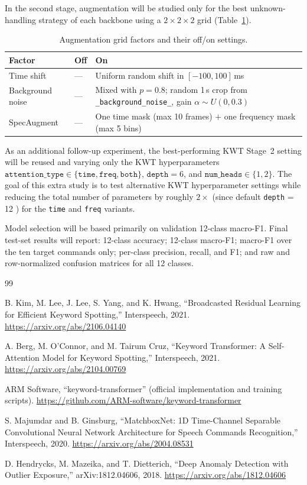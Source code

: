 \documentclass[11pt]{article}
\begin{document}
In the second stage, augmentation will be studied only for the best unknown-handling strategy of each backbone using a \(2\times2\times2\) grid (Table~\ref{tab:aug_grid}).

\begin{table}[h]
\centering
\caption{Augmentation grid factors and their off/on settings.}
\label{tab:aug_grid}
\begin{tabular}{llp{6.5cm}}
\toprule
\textbf{Factor} & \textbf{Off} & \textbf{On} \\
\midrule
Time shift & --- & Uniform random shift in $[-100, 100]$\,ms \\
Background noise & --- & Mixed with $p{=}0.8$; random 1\,s crop from \texttt{\_background\_noise\_}, gain $\alpha \sim U(0, 0.3)$ \\
SpecAugment & --- & One time mask (max 10 frames) $+$ one frequency mask (max 5 bins) \\
\bottomrule
\end{tabular}
\end{table}

As an additional follow-up experiment, the best-performing KWT Stage~2 setting will be reused and varying only the KWT hyperparameters \(\texttt{attention\_type} \in \{\texttt{time}, \texttt{freq}, \texttt{both}\}\), \(\texttt{depth} = 6\), and \(\texttt{num\_heads} \in \{1, 2\}\). The goal of this extra study is to test alternative KWT hyperparameter settings while reducing the total number of parameters by roughly \(2\times\) (since default \texttt{depth} = 12 \cite{kwt}) for the \texttt{time} and \texttt{freq} variants.

Model selection will be based primarily on validation 12-class macro-F1. Final test-set results will report: 12-class accuracy; 12-class macro-F1; macro-F1 over the ten target commands only; per-class precision, recall, and F1; and raw and row-normalized confusion matrices for all 12 classes.



\begin{thebibliography}{99}

B. Kim, M. Lee, J. Lee, S. Yang, and K. Hwang, ``Broadcasted Residual Learning for Efficient Keyword Spotting,'' Interspeech, 2021. \url{https://arxiv.org/abs/2106.04140}

A. Berg, M. O'Connor, and M. Tairum Cruz, ``Keyword Transformer: A Self-Attention Model for Keyword Spotting,'' Interspeech, 2021. \url{https://arxiv.org/abs/2104.00769}

ARM Software, ``keyword-transformer'' (official implementation and training scripts). \url{https://github.com/ARM-software/keyword-transformer}

S. Majumdar and B. Ginsburg, ``MatchboxNet: 1D Time-Channel Separable Convolutional Neural Network Architecture for Speech Commands Recognition,'' Interspeech, 2020. \url{https://arxiv.org/abs/2004.08531}

D. Hendrycks, M. Mazeika, and T. Dietterich, ``Deep Anomaly Detection with Outlier Exposure,'' arXiv:1812.04606, 2018. \url{https://arxiv.org/abs/1812.04606}

\end{thebibliography}
\end{document}
